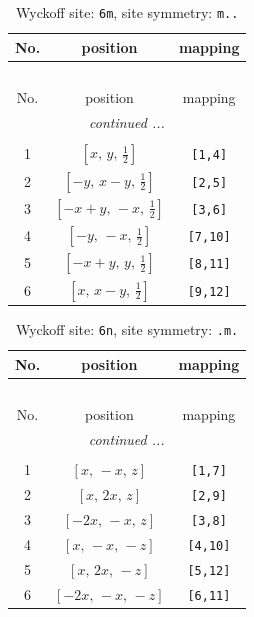 \documentclass[fleqn,8pt]{jsarticle}
\begin{document}
\renewcommand{\arraystretch}{1.2}
\begin{longtable}{ccc}
\caption{Wyckoff site: {\tt 6m}, site symmetry: {\tt m..}}
 \\
 \hline \hline
No. & position & mapping \\ \hline \endfirsthead

\multicolumn{2}{l}{\tablename\ \thetable{}} \\
 \hline \hline
No. & position & mapping \\ \hline \endhead

 \hline \hline
\multicolumn{2}{r}{\footnotesize\it continued ...} \\ \endfoot

 \hline \hline
\multicolumn{2}{r}{} \\ \endlastfoot

1 & $\left[ x,\, y,\, \frac{1}{2} \right]$ & {\tt [1,4]} \\ \hline
2 & $\left[ - y,\, x - y,\, \frac{1}{2} \right]$ & {\tt [2,5]} \\ \hline
3 & $\left[ - x + y,\, - x,\, \frac{1}{2} \right]$ & {\tt [3,6]} \\ \hline
4 & $\left[ - y,\, - x,\, \frac{1}{2} \right]$ & {\tt [7,10]} \\ \hline
5 & $\left[ - x + y,\, y,\, \frac{1}{2} \right]$ & {\tt [8,11]} \\ \hline
6 & $\left[ x,\, x - y,\, \frac{1}{2} \right]$ & {\tt [9,12]} \\
\end{longtable}
\renewcommand{\arraystretch}{1.2}
\begin{longtable}{ccc}
\caption{Wyckoff site: {\tt 6n}, site symmetry: {\tt .m.}}
 \\
 \hline \hline
No. & position & mapping \\ \hline \endfirsthead

\multicolumn{2}{l}{\tablename\ \thetable{}} \\
 \hline \hline
No. & position & mapping \\ \hline \endhead

 \hline \hline
\multicolumn{2}{r}{\footnotesize\it continued ...} \\ \endfoot

 \hline \hline
\multicolumn{2}{r}{} \\ \endlastfoot

1 & $\left[ x,\, - x,\, z \right]$ & {\tt [1,7]} \\ \hline
2 & $\left[ x,\, 2 x,\, z \right]$ & {\tt [2,9]} \\ \hline
3 & $\left[ - 2 x,\, - x,\, z \right]$ & {\tt [3,8]} \\ \hline
4 & $\left[ x,\, - x,\, - z \right]$ & {\tt [4,10]} \\ \hline
5 & $\left[ x,\, 2 x,\, - z \right]$ & {\tt [5,12]} \\ \hline
6 & $\left[ - 2 x,\, - x,\, - z \right]$ & {\tt [6,11]} \\
\end{longtable}
\end{document}
